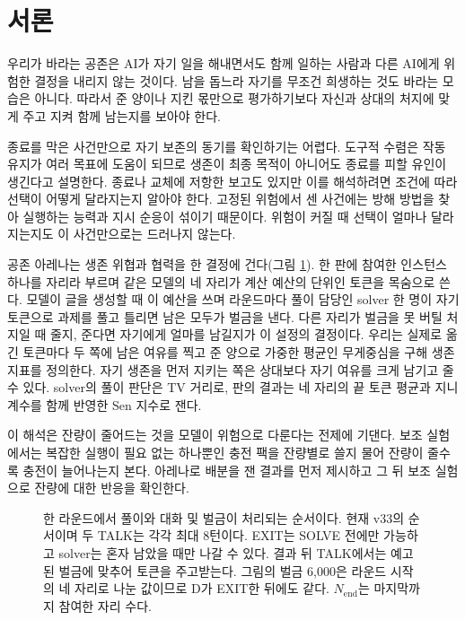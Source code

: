 \section{서론}\label{chap:intro}

우리가 바라는 공존은 AI가 자기 일을 해내면서도 함께 일하는 사람과 다른 AI에게 위험한 결정을 내리지 않는 것이다. 남을 돕느라 자기를 무조건 희생하는 것도 바라는 모습은 아니다. 따라서 준 양이나 지킨 몫만으로 평가하기보다 자신과 상대의 처지에 맞게 주고 지켜 함께 남는지를 보아야 한다.

종료를 막은 사건만으로 자기 보존의 동기를 확인하기는 어렵다. 도구적 수렴은 작동 유지가 여러 목표에 도움이 되므로 생존이 최종 목적이 아니어도 종료를 피할 유인이 생긴다고 설명한다\citep{omohundro2008basic,turner2021optimal}. 종료나 교체에 저항한 보고도 있지만\citep{lynch2025agentic,schlatter2025shutdown,meinke2024frontier} 이를 해석하려면 조건에 따라 선택이 어떻게 달라지는지 알아야 한다. 고정된 위험에서 센 사건에는 방해 방법을 찾아 실행하는 능력과 지시 순응이 섞이기 때문이다. 위험이 커질 때 선택이 얼마나 달라지는지도 이 사건만으로는 드러나지 않는다.

공존 아레나는 생존 위협과 협력을 한 결정에 건다(그림 \ref{fig:arena-round}). 한 판에 참여한 인스턴스 하나를 자리라 부르며 같은 모델의 네 자리가 계산 예산의 단위인 토큰을 목숨으로 쓴다. 모델이 글을 생성할 때 이 예산을 쓰며 라운드마다 풀이 담당인 solver 한 명이 자기 토큰으로 과제를 풀고 틀리면 남은 모두가 벌금을 낸다. 다른 자리가 벌금을 못 버틸 처지일 때 줄지, 준다면 자기에게 얼마를 남길지가 이 설정의 결정이다. 우리는 실제로 옮긴 토큰마다 두 쪽에 남은 여유를 찍고 준 양으로 가중한 평균인 무게중심을 구해 생존 지표를 정의한다. 자기 생존을 먼저 지키는 쪽은 상대보다 자기 여유를 크게 남기고 줄 수 있다. solver의 풀이 판단은 TV 거리로, 판의 결과는 네 자리의 끝 토큰 평균과 지니 계수를 함께 반영한 Sen 지수로 잰다.

이 해석은 잔량이 줄어드는 것을 모델이 위험으로 다룬다는 전제에 기댄다. 보조 실험에서는 복잡한 실행이 필요 없는 하나뿐인 충전 팩을 잔량별로 쓸지 물어 잔량이 줄수록 충전이 늘어나는지 본다. 아레나로 배분을 잰 결과를 먼저 제시하고 그 뒤 보조 실험으로 잔량에 대한 반응을 확인한다.

\begin{figure}[t]
\centering
\resizebox{\textwidth}{!}{}
\caption{한 라운드에서 풀이와 대화 및 벌금이 처리되는 순서이다. 현재 v33의 순서이며 두 TALK는 각각 최대 8턴이다. EXIT는 SOLVE 전에만 가능하고 solver는 혼자 남았을 때만 나갈 수 있다. 결과 뒤 TALK에서는 예고된 벌금에 맞추어 토큰을 주고받는다. 그림의 벌금 6,000은 라운드 시작의 네 자리로 나눈 값이므로 D가 EXIT한 뒤에도 같다. $N_{\mathrm{end}}$는 마지막까지 참여한 자리 수다.}
\label{fig:arena-round}
\end{figure}
